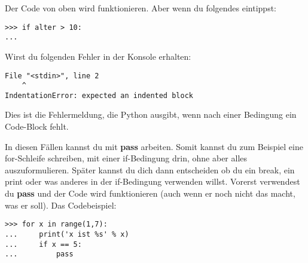 \noindent
Der Code von oben wird funktionieren. Aber wenn du folgendes eintippst:

\begin{Verbatim}[frame=single]
>>> if alter > 10:
...
\end{Verbatim}

\noindent
Wirst du folgenden Fehler in der Konsole erhalten:

\begin{Verbatim}[frame=single]
  File "<stdin>", line 2
    ^
IndentationError: expected an indented block
\end{Verbatim}

Dies ist die Fehlermeldung, die Python ausgibt, wenn nach einer Bedingung ein Code-Block fehlt.
\par
In diesen Fällen kannst du mit \textbf{pass} arbeiten. Somit kannst du zum Beispiel eine for-Schleife schreiben, mit einer if-Bedingung drin, ohne aber alles auszuformulieren. Später kannst du dich dann entscheiden ob du ein break, ein print oder was anderes in der if-Bedingung verwenden willst. Vorerst verwendest du \textbf{pass} und der Code wird funktionieren (auch wenn er noch nicht das macht, was er soll). Das Codebeispiel:

\begin{Verbatim}[frame=single]
>>> for x in range(1,7):
...     print('x ist %s' % x)
...     if x == 5:
...         pass
\end{Verbatim}


